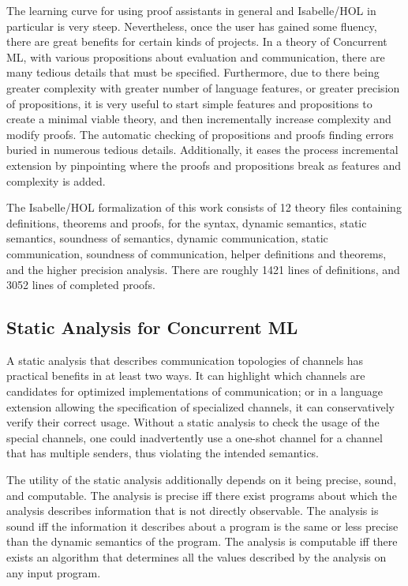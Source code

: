 \documentclass[letterpaper, 11pt]{extarticle}
\begin{document}
The learning curve for using proof assistants in general and Isabelle/HOL in particular is very steep.
Nevertheless, once the user has gained some fluency, there are great benefits for certain kinds of projects.  
In a theory of Concurrent ML, with various propositions about evaluation and communication, there are many
tedious details that must be specified. Furthermore, due to there being greater complexity with greater
number of language features, or greater precision of propositions, it is very useful to start simple features
and propositions to create a minimal viable theory, and then incrementally increase complexity and modify proofs.
The automatic checking of propositions and proofs finding errors buried in numerous tedious details.
Additionally, it eases the process incremental extension by pinpointing where the proofs and propositions break
as features and complexity is added.

The Isabelle/HOL formalization of this work consists of 12 theory files containing definitions, theorems
and proofs, for the syntax, dynamic semantics, static semantics, soundness of semantics, dynamic communication,
static communication, soundness of communication, helper definitions and theorems, and the
higher precision analysis.  There are roughly 1421 lines of definitions, and 3052 lines of completed proofs. 

\subsection{Static Analysis for Concurrent ML}
A static analysis that describes communication
topologies of channels has practical benefits in at least two ways.  It can highlight which
channels are candidates for optimized implementations of communication; or in a language
extension allowing the specification of specialized channels, it can conservatively verify
their correct usage. Without a static analysis to check the usage of the special channels, one
could inadvertently use a one-shot channel for a channel that has multiple senders, thus
violating the intended semantics. 

The utility of the static analysis additionally depends on it being precise, sound, and
computable. The analysis is precise iff there exist programs about which the analysis
describes information that is not directly observable. The analysis is sound iff the
information it describes about a program is the same or less precise than the dynamic
semantics of the program. The analysis is computable iff there exists an algorithm that
determines all the values described by the analysis on any input program.
\end{document}
